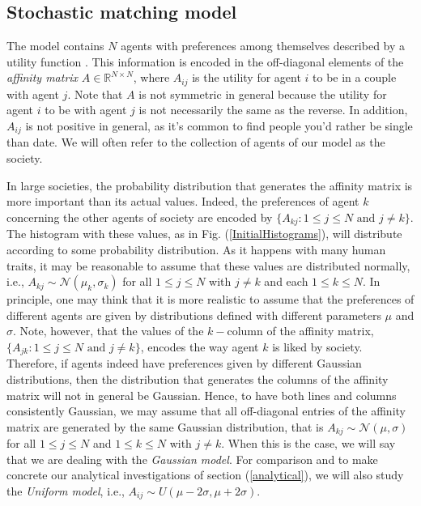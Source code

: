 \documentclass[12pt]{article}
\begin{document}
\subsection{Stochastic matching model}
\label{dynamicalmatching}

The model contains $N$ agents with preferences among themselves described by a utility function \cite{mas1995microeconomic}. This information is encoded in the off-diagonal elements of the \textit{affinity matrix} $A\in\mathbb{R}^{N\times N}$, where $A_{ij}$ is the utility for agent $i$ to be in a couple with agent $j$. Note that $A$ is not symmetric in general because the utility for agent $i$ to be with agent $j$ is not necessarily the same as the reverse. In addition, $A_{ij}$ is not positive in general, as it's common to find people you'd rather be single than date. %
We will often refer to the collection of agents of our model as the society.

In large societies, the probability distribution that generates the affinity matrix is more important than its actual values. Indeed, the preferences of agent $k$ concerning the other agents of society are encoded by $\{A_{kj}:1\leq j\leq N\textrm{ and } j\neq k\}$. The histogram with these values, as in Fig. (\ref{InitialHistograms}), will distribute according to some probability distribution. As it happens with many human traits, it may be reasonable to assume that these values are distributed normally, i.e., $A_{kj}\sim\mathcal{N}(\mu_k,\sigma_k)$ for all $1\leq j\leq N$ with $j\neq k$ and each $1\leq k\leq N$. In principle, one may think that it is more realistic to assume that the preferences of different agents are given by distributions defined with different parameters $\mu$ and $\sigma$. Note, however, that the values of the $k-$column of the affinity matrix, $\{A_{jk}:1\leq j\leq N\textrm{ and } j\neq k\}$, encodes the way agent $k$ is liked by society. Therefore, if agents indeed have preferences given by different Gaussian distributions, then the distribution that generates the columns of the affinity matrix will not in general be Gaussian. Hence, to have both lines and columns consistently Gaussian, we may assume that all off-diagonal entries of the affinity matrix are generated by the same Gaussian distribution, that is $A_{kj}\sim\mathcal{N}(\mu,\sigma)$ for all $1\leq j\leq N$ and $1\leq k\leq N$ with $j\neq k$. When this is the case, we will say that we are dealing with the \textit{Gaussian model}. For comparison and to make concrete our analytical investigations of section (\ref{analytical}), we will also study the \textit{Uniform model}, i.e., $A_{ij}\sim U(\mu-2\sigma,\mu+2\sigma)$.%
\end{document}

